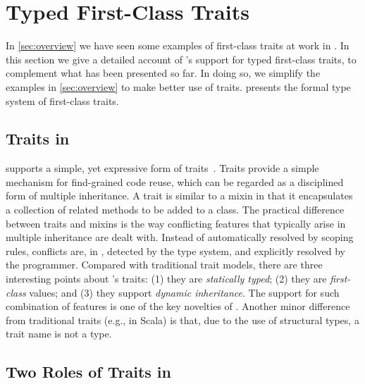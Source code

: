 \section{Typed First-Class Traits}
\label{sec:traits}

In \cref{sec:overview} we have seen some examples of first-class traits at work
in \name. In this section we give a detailed account of \name's support for
typed first-class traits, to complement what has been presented so far. In doing so,
we simplify the examples in \cref{sec:overview} to make better use of traits.
 presents the formal type system of first-class traits.

\subsection{Traits in \name}

\name supports a simple, yet expressive form of traits~\cite{scharli2003traits}.
Traits provide a simple mechanism for find-grained code reuse, which
can be regarded as a disciplined form of multiple inheritance. A trait is
similar to a mixin in that it encapsulates a collection of related methods to be
added to a class. The
practical difference between traits and mixins is the way conflicting features
that typically arise in multiple inheritance are dealt with. Instead of
automatically resolved by scoping rules, conflicts are, in \name,
detected by the type system, and explicitly resolved by the programmer. Compared
with traditional trait models, there are three interesting points about
\name's traits: (1) they are \emph{statically typed}; (2) they are
\emph{first-class} values; and (3) they support \emph{dynamic inheritance}. The
support for such combination of features is one of the key novelties of \name.
Another minor difference from traditional traits (e.g., in Scala) is that,
due to the use of structural types, a trait name is not a type.

\subsection{Two Roles of Traits in \name}

